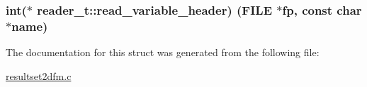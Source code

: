 \subsubsection[{\texorpdfstring{read\+\_\+variable\+\_\+header}{read_variable_header}}]{\setlength{\rightskip}{0pt plus 5cm}int($\ast$ reader\+\_\+t\+::read\+\_\+variable\+\_\+header) (F\+I\+LE $\ast$fp, const char $\ast$name)}\hypertarget{structreader__t_a1a15124a6e198c9f8a460f503071d2a6}{}\label{structreader__t_a1a15124a6e198c9f8a460f503071d2a6}


The documentation for this struct was generated from the following file\+:\begin{DoxyCompactItemize}
\item 
\hyperlink{resultset2dfm_8c}{resultset2dfm.\+c}\end{DoxyCompactItemize}
